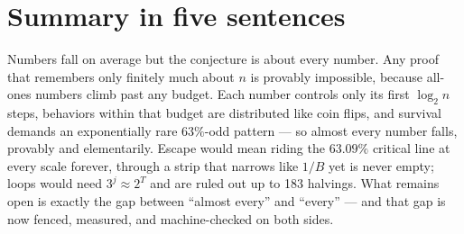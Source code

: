 \documentclass[11pt]{article}
\begin{document}
\section{Summary in five sentences}

Numbers fall on average but the conjecture is about every number.
Any proof that remembers only finitely much about $n$ is provably
impossible, because all-ones numbers climb past any budget. Each number
controls only its first $\log_2 n$ steps, behaviors within that budget
are distributed like coin flips, and survival demands an exponentially
rare $63\%$-odd pattern --- so almost every number falls, provably and
elementarily. Escape would mean riding the $63.09\%$ critical line at
every scale forever, through a strip that narrows like $1/B$ yet is
never empty; loops would need $3^j \approx 2^T$ and are ruled out up to
183 halvings. What remains open is exactly the gap between ``almost
every'' and ``every'' --- and that gap is now fenced, measured, and
machine-checked on both sides.
\end{document}
